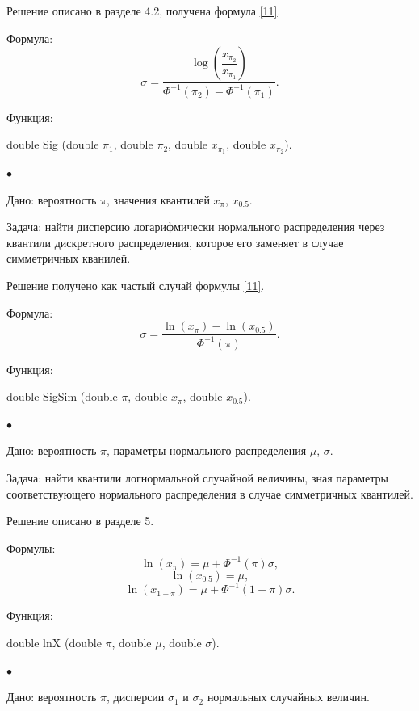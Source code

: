 \documentclass[12pt]{article}
\begin{document}
	Решение описано в разделе 4.2, получена формула \eqref{11}.
	
	Формула:
	\begin{equation*}
		\displaystyle{\sigma = \dfrac{\log\left(\dfrac{x_{\pi_{2}}}{x_{\pi_{1}}}\right)}{\Phi ^{-1}(\pi_{2}) - \Phi ^{-1}(\pi_{1})}}.
	\end{equation*}
	
	Функция:
	
	double Sig (double $\pi_{1}$, double $\pi_{2}$, double $x_{\pi_{1}}$, double $x_{\pi_{2}}$).
	
	$\bullet$
	
	Дано:
	вероятность $\pi$, значения квантилей $x_{\pi}$, $x_{0.5}$.
	
	Задача:
	найти дисперсию логарифмически нормального распределения через квантили дискретного распределения, которое его заменяет в случае симметричных кванилей.
	
	Решение получено как частый случай формулы \eqref{11}.
	
	Формула:
	\begin{equation*}
		\sigma=\frac{\ln(x_{\pi})-\ln(x_{0.5})}{\Phi^{-1}(\pi)}.
	\end{equation*}
	
	Функция:
	
	double SigSim (double $\pi$, double $x_{\pi}$, double $x_{0.5}$).
	
	
	$\bullet$
	
	Дано:
	вероятность $\pi$, параметры нормального распределения $\mu$, $\sigma$.
	
	Задача:
	найти квантили логнормальной случайной величины, зная параметры соответствующего нормального распределения в случае симметричных квантилей. 
	
	Решение описано в разделе 5.
	
	Формулы:
	\begin{equation*}
		\ln(x_{\pi})=\mu+\Phi^{-1}(\pi)\sigma,
	\end{equation*}
	\begin{equation*}
		\ln(x_{0.5})=\mu,
	\end{equation*}
	\begin{equation*}
		\ln(x_{1-\pi})=\mu+\Phi^{-1}(1-\pi)\sigma.
	\end{equation*}
	
	Функция:
	
	double lnX (double $\pi$, double $\mu$, double $\sigma$).
	
	$\bullet$
	
	Дано:
	вероятность $\pi$, дисперсии $\sigma_{1}$ и $\sigma_{2}$ нормальных случайных величин.
	
\end{document}
